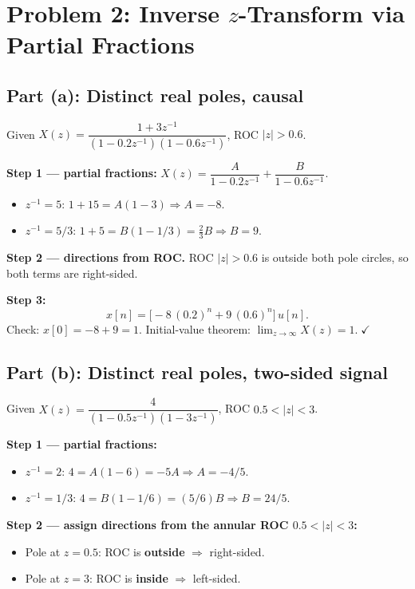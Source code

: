 \documentclass[11pt]{article}
\begin{document}
\section*{Problem 2: Inverse $z$-Transform via Partial Fractions}

\subsection*{Part (a): Distinct real poles, causal}
Given $X(z)=\dfrac{1+3z^{-1}}{(1-0.2z^{-1})(1-0.6z^{-1})}$, ROC $|z|>0.6$.

\textbf{Step 1 --- partial fractions:} $X(z)=\dfrac{A}{1-0.2z^{-1}}+\dfrac{B}{1-0.6z^{-1}}$.
\begin{itemize}[leftmargin=*]
\item $z^{-1}=5$: $1+15=A(1-3)\Rightarrow A=-8$.
\item $z^{-1}=5/3$: $1+5=B(1-1/3)=\tfrac{2}{3}B\Rightarrow B=9$.
\end{itemize}

\textbf{Step 2 --- directions from ROC.} ROC $|z|>0.6$ is outside both pole circles, so both terms are right-sided.

\textbf{Step 3:}
\begin{equation*}
\boxed{x[n]=\bigl[-8\,(0.2)^{n}+9\,(0.6)^{n}\bigr]\,u[n].}
\end{equation*}
Check: $x[0]=-8+9=1$. Initial-value theorem: $\lim_{z\to\infty}X(z)=1.\;\checkmark$

\subsection*{Part (b): Distinct real poles, two-sided signal}
Given $X(z)=\dfrac{4}{(1-0.5z^{-1})(1-3z^{-1})}$, ROC $0.5<|z|<3$.

\textbf{Step 1 --- partial fractions:}
\begin{itemize}[leftmargin=*]
\item $z^{-1}=2$: $4=A(1-6)=-5A\Rightarrow A=-4/5$.
\item $z^{-1}=1/3$: $4=B(1-1/6)=(5/6)B\Rightarrow B=24/5$.
\end{itemize}

\textbf{Step 2 --- assign directions from the annular ROC $0.5<|z|<3$:}
\begin{itemize}[leftmargin=*]
\item Pole at $z=0.5$: ROC is \textbf{outside} $\Rightarrow$ right-sided.
\item Pole at $z=3$: ROC is \textbf{inside} $\Rightarrow$ left-sided.
\end{itemize}
\end{document}
